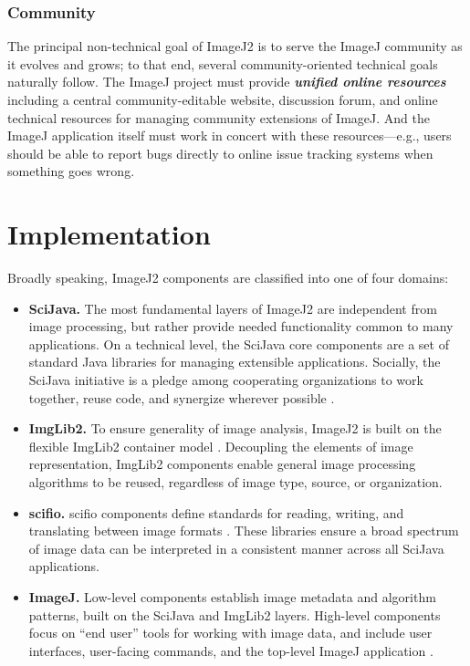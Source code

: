 \documentclass{bmcart}
\begin{document}
\subsubsection*{Community}
The principal non-technical goal of ImageJ2 is to serve the ImageJ community as
it evolves and grows; to that end, several community-oriented technical goals
naturally follow. The ImageJ project must provide \textbf{\textit{unified
online resources}} including a central community-editable website, discussion
forum, and online technical resources for managing community extensions of
ImageJ. And the ImageJ application itself must work in concert with these
resources---e.g., users should be able to report bugs directly to online issue
tracking systems when something goes wrong.


\section*{Implementation}
Broadly speaking, ImageJ2 components are classified into one of four domains:

\begin{itemize}
  \item \textbf{SciJava.} The most fundamental layers of ImageJ2 are
    independent from image processing, but rather provide needed functionality
    common to many applications. On a technical level, the SciJava core
    components are a set of standard Java libraries for managing extensible
    applications. Socially, the SciJava initiative is a pledge among
    cooperating organizations to work together, reuse code, and synergize
    wherever possible \cite{imagej_scijava}.
  \item \textbf{ImgLib2.} To ensure generality of image analysis, ImageJ2 is
    built on the flexible ImgLib2 container model \cite{imglib2}. Decoupling the
    elements of image representation, ImgLib2 components enable general image
    processing algorithms to be reused, regardless of image type, source, or
    organization.
  \item \textbf{\acrfull{scifio}.} \acrshort{scifio} components define
    standards for reading, writing, and translating between image formats
    \cite{scifio}. These libraries ensure a broad spectrum of image data can be
    interpreted in a consistent manner across all SciJava applications.
  \item \textbf{ImageJ.} Low-level components establish image metadata and algorithm
    patterns, built on the SciJava and ImgLib2 layers. High-level
    components focus on ``end user'' tools for working with image data,
    and include user interfaces, user-facing commands, and the top-level
    ImageJ application \cite{imagej_web_site}.
\end{itemize}
\end{document}
